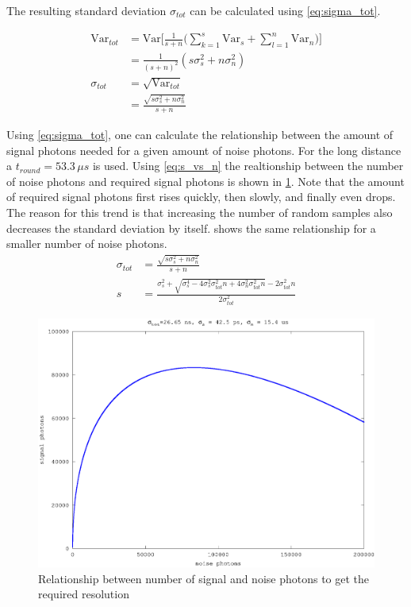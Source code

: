 The resulting standard deviation $\sigma_{tot}$ can be calculated using \cref{eq:sigma_tot}.

\begin{align}
\text{Var}_{tot} &= \text{Var}\Big[\frac{1}{s+n}\Big(\sum_{k=1}^s\text{Var}_s+\sum_{l=1}^n\text{Var}_n\Big)\Big]\\
&= \frac{1}{(s+n)^2}(s\sigma_s^2+n\sigma_n^2)\\
\sigma_{tot} &= \sqrt{\text{Var}_{tot}}\\
&= \frac{\sqrt{s\sigma_s^2+n\sigma_n^2}}{s+n} \label{eq:sigma_tot}
\end{align}

Using \cref{eq:sigma_tot}, one can calculate the relationship between the amount of signal photons needed for a given amount of noise photons. For the long distance a $t_{round}=53.3\,\mu s$ is used. Using \cref{eq:s_vs_n} the realtionship between the number of noise photons and required signal photons is shown in \cref{fig:altimetry_s_vs_n}. Note that the amount of required signal photons first rises quickly, then slowly, and finally even drops. The reason for this trend is that increasing the number of random samples also decreases the standard deviation by itself.  shows the same relationship for a smaller number of noise photons. 
\begin{align}
\sigma_{tot} &= \frac{\sqrt{s\sigma_s^2+n\sigma_n^2}}{s+n} \\
s &= \frac{\sigma_s^2+\sqrt{\sigma_s^4-4\sigma_s^2\sigma_{tot}^2n+4\sigma_n^2\sigma_{tot}^2n}-2\sigma_{tot}^2n}{2\sigma_{tot}^2}\label{eq:s_vs_n}
\end{align} 

\begin{figure}[h]
\centering
	\includegraphics[width=0.8\linewidth]{fig/altimetry_s_vs_n.eps}
\caption{Relationship between number of signal and noise photons to get the required resolution}
\label{fig:altimetry_s_vs_n}
\end{figure}

